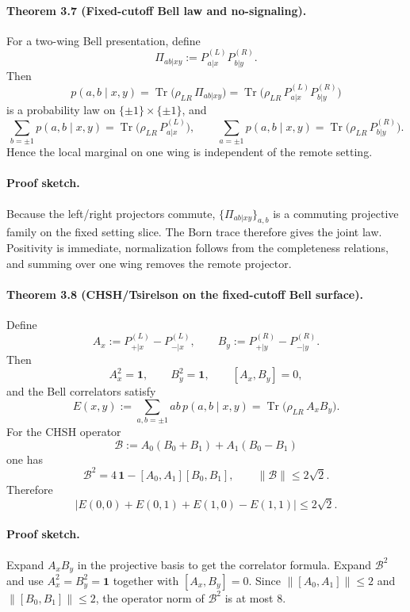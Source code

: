 \paragraph{\textbf{Theorem 3.7 (Fixed-cutoff Bell law and no-signaling).}}
For a two-wing Bell presentation, define
\[
\Pi_{ab|xy}:=P_{a|x}^{(L)}P_{b|y}^{(R)}.
\]
Then
\[
p(a,b\mid x,y)
=
\operatorname{Tr}\!\bigl(\rho_{LR}\,\Pi_{ab|xy}\bigr)
=
\operatorname{Tr}\!\bigl(\rho_{LR}\,P_{a|x}^{(L)}P_{b|y}^{(R)}\bigr)
\]
is a probability law on \(\{ \pm1\}\times\{\pm1\}\), and
\[
\sum_{b=\pm1} p(a,b\mid x,y)
=
\operatorname{Tr}\!\bigl(\rho_{LR}\,P_{a|x}^{(L)}\bigr),
\qquad
\sum_{a=\pm1} p(a,b\mid x,y)
=
\operatorname{Tr}\!\bigl(\rho_{LR}\,P_{b|y}^{(R)}\bigr).
\]
Hence the local marginal on one wing is independent of the remote setting.

\paragraph{\textbf{Proof sketch.}}
Because the left/right projectors commute, \(\{\Pi_{ab|xy}\}_{a,b}\) is a commuting projective
family on the fixed setting slice. The Born trace therefore gives the joint law. Positivity is
immediate, normalization follows from the completeness relations, and summing over one wing
removes the remote projector.

\paragraph{\textbf{Theorem 3.8 (CHSH/Tsirelson on the fixed-cutoff Bell surface).}}
Define
\[
A_x:=P_{+|x}^{(L)}-P_{-|x}^{(L)},
\qquad
B_y:=P_{+|y}^{(R)}-P_{-|y}^{(R)}.
\]
Then
\[
A_x^2=\mathbf 1,
\qquad
B_y^2=\mathbf 1,
\qquad
[A_x,B_y]=0,
\]
and the Bell correlators satisfy
\[
E(x,y)
:=
\sum_{a,b=\pm1}ab\,p(a,b\mid x,y)
=
\operatorname{Tr}\!\bigl(\rho_{LR}\,A_xB_y\bigr).
\]
For the CHSH operator
\[
\mathcal B:=A_0(B_0+B_1)+A_1(B_0-B_1)
\]
one has
\[
\mathcal B^2
=
4\,\mathbf 1-[A_0,A_1][B_0,B_1],
\qquad
\|\mathcal B\|\le 2\sqrt2.
\]
Therefore
\[
\bigl|E(0,0)+E(0,1)+E(1,0)-E(1,1)\bigr|
\le
2\sqrt2.
\]

\paragraph{\textbf{Proof sketch.}}
Expand \(A_xB_y\) in the projective basis to get the correlator formula. Expand \(\mathcal B^2\)
and use \(A_x^2=B_y^2=\mathbf 1\) together with \([A_x,B_y]=0\). Since
\(\|[A_0,A_1]\|\le 2\) and \(\|[B_0,B_1]\|\le 2\), the operator norm of \(\mathcal B^2\) is at
most \(8\).

